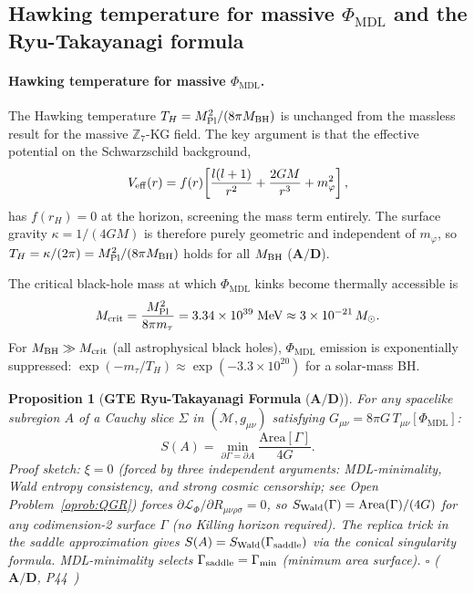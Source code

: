 \documentclass[11pt]{article}
\newtheorem{proposition}[theorem]{Proposition}
\theoremstyle{remark}
\newcommand{\PHIMDL}{\Phi_{\mathrm{MDL}}}
\newcommand{\ZS}{\mathbb{Z}_7}
\newcommand{\CatAD}{\textbf{A/D}}
\begin{document}
\subsection{Hawking temperature for massive \texorpdfstring{$\PHIMDL$}{Phi-MDL} and the Ryu-Takayanagi formula}

\paragraph{Hawking temperature for massive $\PHIMDL$.}
The Hawking temperature $T_H = M_{\rm Pl}^2/(8\pi M_{\rm BH})$ is
unchanged from the massless result for the massive $\ZS$-KG field.
The key argument is that the effective potential on the Schwarzschild
background,
\begin{equation}
  V_{\rm eff}(r) = f(r)\!\left[\frac{l(l+1)}{r^2} + \frac{2GM}{r^3}
  + m_\varphi^2\right],
  \label{eq:veff_hawking}
\end{equation}
has $f(r_H) = 0$ at the horizon, screening the mass term entirely.
The surface gravity $\kappa = 1/(4GM)$ is therefore purely geometric
and independent of $m_\varphi$, so $T_H = \kappa/(2\pi) = M_{\rm Pl}^2/(8\pi M_{\rm BH})$
holds for all $M_{\rm BH}$ ($\CatAD$).

The critical black-hole mass at which $\PHIMDL$ kinks become thermally accessible is
\begin{equation}
  M_{\rm crit} = \frac{M_{\rm Pl}^2}{8\pi m_\tau} = 3.34\times10^{39}\;\text{MeV}
  \approx 3\times10^{-21}\,M_\odot.
  \label{eq:mcrit}
\end{equation}
For $M_{\rm BH} \gg M_{\rm crit}$ (all astrophysical black holes), $\PHIMDL$
emission is exponentially suppressed:
$\exp(-m_\tau/T_H) \approx \exp(-3.3\times10^{20})$ for a solar-mass BH.

\begin{proposition}[\textbf{GTE Ryu-Takayanagi Formula} ($\CatAD$)]
\label{prop:rt_formula}
For any spacelike subregion $A$ of a Cauchy slice $\Sigma$ in
$(\mathcal{M}, g_{\mu\nu})$ satisfying $G_{\mu\nu} = 8\pi G\,T_{\mu\nu}[\PHIMDL]$:
\begin{equation}
  S(A) = \min_{\partial\Gamma = \partial A} \frac{\mathrm{Area}[\Gamma]}{4G}.
  \label{eq:rt_formula}
\end{equation}
\textit{Proof sketch:} $\xi=0$ (forced by three independent arguments:
MDL-minimality, Wald entropy consistency, and strong cosmic censorship;
see Open Problem~\ref{oprob:QGR}) forces $\partial \mathcal{L}_\Phi/\partial R_{\mu\nu\rho\sigma} = 0$,
so $S_{\rm Wald}(\Gamma) = \mathrm{Area}(\Gamma)/(4G)$ for any codimension-2
surface $\Gamma$ (no Killing horizon required).  The replica trick in the
saddle approximation gives $S(A) = S_{\rm Wald}(\Gamma_{\rm saddle})$ via
the conical singularity formula.  MDL-minimality selects
$\Gamma_{\rm saddle} = \Gamma_{\rm min}$ (minimum area surface).
$\square$ ($\CatAD$, P44~\cite{SpivackQGR})
\end{proposition}
\end{document}
